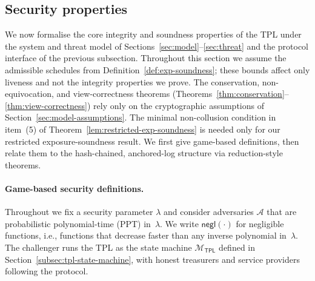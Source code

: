 \documentclass[11pt]{article}
\begin{document}
\subsection{Security properties}
\label{subsec:security}

We now formalise the core integrity and soundness properties of the TPL
under the system and threat model of Sections~\ref{sec:model}--\ref{sec:threat}
and the protocol interface of the previous subsection.
Throughout this section we assume the admissible schedules from Definition~\ref{def:exp-soundness}; these bounds affect only liveness and not the integrity properties we prove. The conservation, non-equivocation, and view-correctness theorems (Theorems~\ref{thm:conservation}--\ref{thm:view-correctness}) rely only on the cryptographic assumptions of Section~\ref{sec:model-assumptions}. The minimal non-collusion condition in item~(5) of Theorem~\ref{lem:restricted-exp-soundness} is needed only for our restricted exposure-soundness result.
We first give game-based definitions, then relate them to the hash-chained,
anchored-log structure via reduction-style theorems.

\paragraph{Game-based security definitions.}

Throughout we fix a security parameter $\lambda$ and consider adversaries
$\mathcal{A}$ that are probabilistic polynomial-time (PPT) in~$\lambda$.
We write $\mathsf{negl}(\cdot)$ for negligible functions, i.e., functions that
decrease faster than any inverse polynomial in~$\lambda$.
The challenger runs the TPL as the state machine
$\mathcal{M}_{\mathsf{TPL}}$ defined in Section~\ref{subsec:tpl-state-machine},
with honest treasurers and service providers following the protocol.
\end{document}
